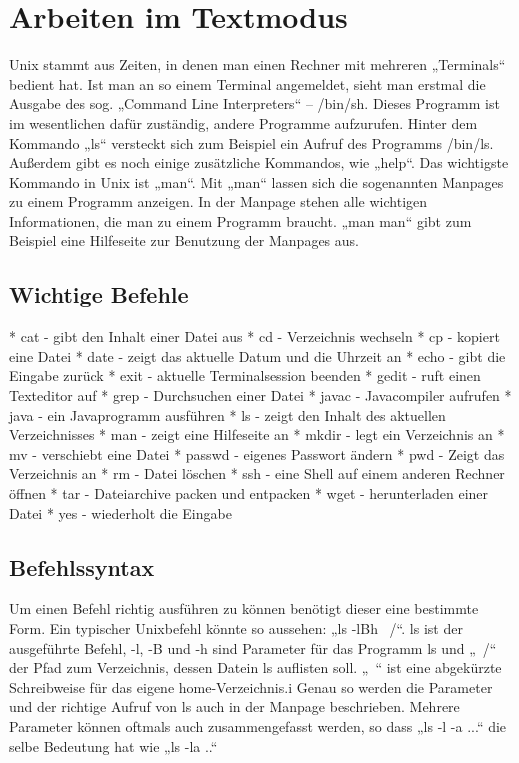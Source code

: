 \section{Arbeiten im Textmodus}
Unix stammt aus Zeiten, in denen man einen Rechner mit mehreren „Terminals“ bedient hat. Ist man an so einem Terminal angemeldet, sieht man erstmal die Ausgabe des sog. „Command Line Interpreters“ – /bin/sh. Dieses Programm ist im wesentlichen dafür zuständig, andere Programme aufzurufen. Hinter dem Kommando „ls“ versteckt sich zum Beispiel ein Aufruf des Programms /bin/ls. Außerdem gibt es noch einige zusätzliche Kommandos, wie „help“. Das wichtigste Kommando in Unix ist „man“. Mit „man“ lassen sich die sogenannten Manpages zu einem Programm anzeigen. In der Manpage stehen alle wichtigen Informationen, die man zu einem Programm braucht.
„man man“ gibt zum Beispiel eine Hilfeseite zur Benutzung der Manpages aus.

\subsection{Wichtige Befehle}
* cat - gibt den Inhalt einer Datei aus
* cd - Verzeichnis wechseln
* cp - kopiert eine Datei
* date - zeigt das aktuelle Datum und die Uhrzeit an
* echo - gibt die Eingabe zurück
* exit - aktuelle Terminalsession beenden
* gedit - ruft einen Texteditor auf
* grep - Durchsuchen einer Datei
* javac - Javacompiler aufrufen
* java - ein Javaprogramm ausführen
* ls - zeigt den Inhalt des aktuellen Verzeichnisses
* man - zeigt eine Hilfeseite an
* mkdir - legt ein Verzeichnis an
* mv - verschiebt eine Datei
* passwd - eigenes Passwort ändern
* pwd - Zeigt das Verzeichnis an
* rm - Datei löschen
* ssh - eine Shell auf einem anderen Rechner öffnen
* tar - Dateiarchive packen und entpacken
* wget - herunterladen einer Datei
* yes - wiederholt die Eingabe

\subsection{Befehlssyntax}
Um einen Befehl richtig ausführen zu können benötigt dieser eine bestimmte Form. Ein typischer Unixbefehl könnte so aussehen:
„ls -lBh ~/“. ls ist der ausgeführte Befehl, -l, -B und -h sind Parameter für das Programm ls und „~/“ der Pfad zum Verzeichnis, dessen Datein ls auflisten soll. „~“ ist eine abgekürzte Schreibweise für das eigene home-Verzeichnis.i
Genau so werden die Parameter und der richtige Aufruf von ls auch in der Manpage beschrieben. Mehrere Parameter können oftmals auch zusammengefasst werden, so dass „ls -l -a ...“ die selbe Bedeutung hat wie „ls -la ..“


